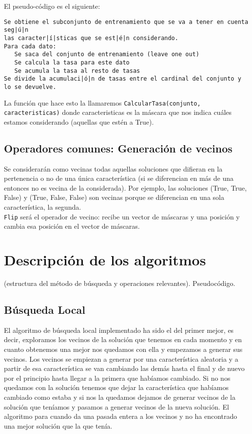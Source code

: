 \documentclass[12pt]{article}
\begin{document}
El pseudo-código es el siguiente:\\
\begin{lstlisting}
Se obtiene el subconjunto de entrenamiento que se va a tener en cuenta seg|ú|n 
las caracter|í|sticas que se est|é|n considerando.
Para cada dato:
   Se saca del conjunto de entrenamiento (leave one out)
   Se calcula la tasa para este dato
   Se acumula la tasa al resto de tasas
Se divide la acumulaci|ó|n de tasas entre el cardinal del conjunto y 
lo se devuelve.
\end{lstlisting}
La función que hace esto la llamaremos \texttt{CalcularTasa(conjunto, caracteristicas)} donde caracteristicas es la máscara que nos indica cuáles estamos considerando (aquellas que estén a True).

\subsection{Operadores comunes: Generación de vecinos}
Se considerarán como vecinas todas aquellas soluciones que difieran en la pertenencia o no de una única característica (si se diferencian en más de una entonces no es vecina de la considerada). Por ejemplo, las soluciones (True, True, False) y (True, False, False) son vecinas porque se diferencian en una sola característica, la segunda.\\
\texttt{Flip} será el operador de vecino: recibe un vector de máscaras y una posición y cambia esa posición en el vector de máscaras.\\

\newpage

\section{Descripción de los algoritmos}
(estructura del método de búsqueda y operaciones relevantes). Pseudocódigo.
\subsection{Búsqueda Local}
El algoritmo de búsqueda local implementado ha sido el del primer mejor, es decir, exploramos los vecinos de la solución que tenemos en cada momento y en cuanto obtenemos una mejor nos quedamos con ella y empezamos a generar sus vecinos. Los vecinos se empiezan a generar por una característica aleatoria y a partir de esa característica se van cambiando las demás hasta el final y de nuevo por el principio hasta llegar a la primera que habíamos cambiado. Si no nos quedamos con la solución tenemos que dejar la característica que habíamos cambiado como estaba y si nos la quedamos dejamos de generar vecinos de la solución que teníamos y pasamos a generar vecinos de la nueva solución. El algoritmo para cuando da una pasada entera a los vecinos y no ha encontrado una mejor solución que la que tenía.\\
\end{document}
